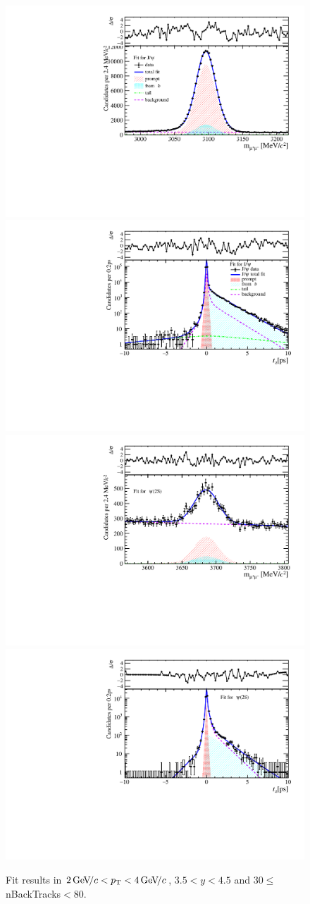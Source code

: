 \begin{figure}[H]
\begin{center}
\includegraphics[width=0.47\linewidth]{pdf/Jpsi/drawmassB/n5y3pt2.pdf}
\includegraphics[width=0.47\linewidth]{pdf/Jpsi/2DFitB/n5y3pt2.pdf}
\vspace*{-0.5cm}
\includegraphics[width=0.47\linewidth]{pdf/Psi2S/drawmassB/n5y3pt2.pdf}
\includegraphics[width=0.47\linewidth]{pdf/Psi2S/2DFitB/n5y3pt2.pdf}
\vspace*{-0.5cm}
\end{center}
\caption{Fit results in $2\text{\,Ge\kern -0.1em V\!/}c<p_{\mathrm{T}}<4\text{\,Ge\kern -0.1em V\!/}c$, $3.5<y<4.5$ and 30$\leq$nBackTracks$<$80.}
\label{Fitn5y3pt2}
\end{figure}
